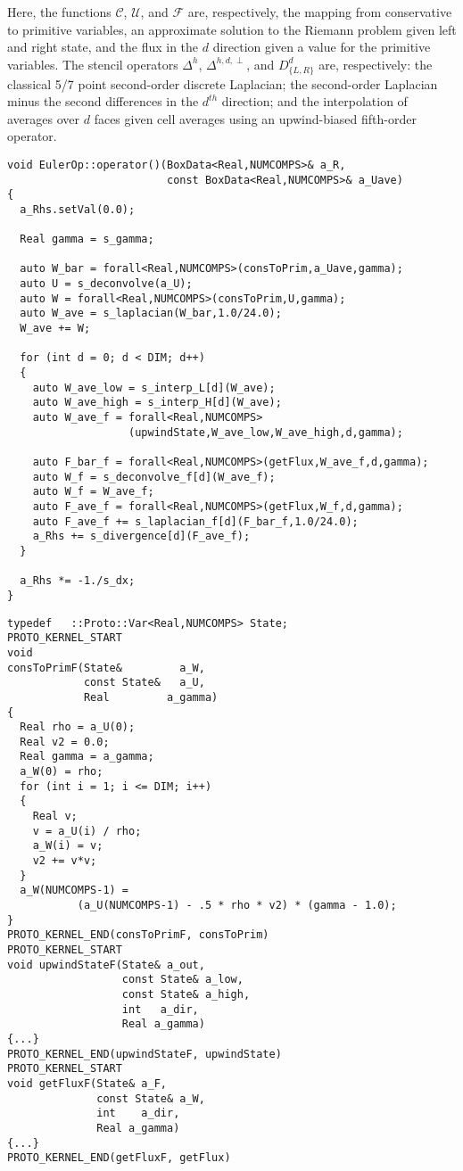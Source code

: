 \documentclass[12pt]{article}
\newcommand{\rhs}{right-hand side }
\begin{document}
Here, the functions $\mathcal{C}$, $\mathcal{U}$, and $\mathcal{F}$ are, respectively, the mapping from conservative to primitive variables, an approximate solution to the Riemann problem given left and right state, and the flux in the $d$ direction given a value for the primitive variables. The stencil operators $\Delta^h$, $\Delta^{h,d,\perp}$, and $D_{\{L,R\}}^d$ are, respectively: the classical 5/7 point second-order discrete Laplacian; the second-order Laplacian minus the second differences in the $d^{th}$ direction; and the interpolation of averages over $d$ faces given cell averages using an upwind-biased fifth-order operator. 
\begin{lstlisting}[label = eulerOp,caption = High-order upwind \rhs for compressible Euler]
void EulerOp::operator()(BoxData<Real,NUMCOMPS>& a_R,
                         const BoxData<Real,NUMCOMPS>& a_Uave)
{
  a_Rhs.setVal(0.0);

  Real gamma = s_gamma;
  
  auto W_bar = forall<Real,NUMCOMPS>(consToPrim,a_Uave,gamma);
  auto U = s_deconvolve(a_U);
  auto W = forall<Real,NUMCOMPS>(consToPrim,U,gamma);
  auto W_ave = s_laplacian(W_bar,1.0/24.0);
  W_ave += W;

  for (int d = 0; d < DIM; d++)
  {  
    auto W_ave_low = s_interp_L[d](W_ave);
    auto W_ave_high = s_interp_H[d](W_ave);    
    auto W_ave_f = forall<Real,NUMCOMPS>
                   (upwindState,W_ave_low,W_ave_high,d,gamma);  

    auto F_bar_f = forall<Real,NUMCOMPS>(getFlux,W_ave_f,d,gamma);
    auto W_f = s_deconvolve_f[d](W_ave_f);
    auto W_f = W_ave_f;   
    auto F_ave_f = forall<Real,NUMCOMPS>(getFlux,W_f,d,gamma);
    auto F_ave_f += s_laplacian_f[d](F_bar_f,1.0/24.0);
    a_Rhs += s_divergence[d](F_ave_f);
  }

  a_Rhs *= -1./s_dx;
}
\end{lstlisting}
\begin{lstlisting}[label = eulerFunctions,caption = Pointwise functions for Euler]
typedef   ::Proto::Var<Real,NUMCOMPS> State;
PROTO_KERNEL_START
void 
consToPrimF(State&         a_W, 
            const State&   a_U,
            Real         a_gamma)
{
  Real rho = a_U(0);
  Real v2 = 0.0;
  Real gamma = a_gamma;
  a_W(0) = rho;   
  for (int i = 1; i <= DIM; i++)
  {
    Real v;
    v = a_U(i) / rho;        
    a_W(i) = v;
    v2 += v*v;
  }   
  a_W(NUMCOMPS-1) = 
           (a_U(NUMCOMPS-1) - .5 * rho * v2) * (gamma - 1.0);
}
PROTO_KERNEL_END(consToPrimF, consToPrim)
PROTO_KERNEL_START
void upwindStateF(State& a_out,
                  const State& a_low,
                  const State& a_high,
                  int   a_dir,
                  Real a_gamma)
{...}
PROTO_KERNEL_END(upwindStateF, upwindState)
PROTO_KERNEL_START
void getFluxF(State& a_F, 
              const State& a_W, 
              int    a_dir,
              Real a_gamma)
{...}
PROTO_KERNEL_END(getFluxF, getFlux)
\end{lstlisting}
\end{document}
